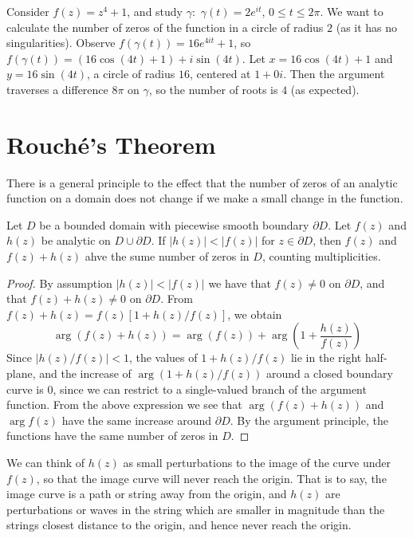 \begin{example}
    Consider $f(z) = z^4 + 1$, and study $\gamma:$ $\gamma(t) = 2e^{it}$, $0 \leq t \leq 2\pi$. We want to calculate the number of zeros of the function in a circle of radius $2$ (as it has no singularities). Observe $f(\gamma(t)) = 16e^{4it}+1$, so $f(\gamma(t)) = (16\cos(4t)+1)+i\sin(4t)$. Let $x = 16\cos(4t)+1$ and $y = 16\sin(4t)$, a circle of radius $16$, centered at $1+0i$. Then the argument traverses a difference $8\pi$ on $\gamma$, so the number of roots is $4$ (as expected).
\end{example}





\section{Rouch\'{e}'s Theorem}

There is a general principle to the effect that the number of zeros of an analytic function on a domain does not change if we make a small change in the function. 

\begin{theorem}
    Let $D$ be a bounded domain with piecewise smooth boundary $\partial D$. Let $f(z)$ and $h(z)$ be analytic on $D\cup \partial D$. If $|h(z)| < |f(z)|$ for $z \in \partial D$, then $f(z)$ and $f(z)+h(z)$ ahve the sume number of zeros in $D$, counting multiplicities.
\end{theorem}
\begin{proof}
    By assumption $|h(z)| < |f(z)|$ we have that $f(z) \neq 0$ on $\partial D$, and that $f(z)+h(z) \neq 0$ on $\partial D$. From $f(z)+h(z) = f(z)[1+h(z)/f(z)]$, we obtain \begin{equation*}
        \arg(f(z)+h(z)) = \arg(f(z))+\arg\left(1+\frac{h(z)}{f(z)}\right)
    \end{equation*}
    Since $|h(z)/f(z)| < 1$, the values of $1+h(z)/f(z)$ lie in the right half-plane, and the increase of $\arg(1+h(z)/f(z))$ around a closed boundary curve is $0$, since we can restrict to a single-valued branch of the argument function. From the above expression we see that $\arg(f(z)+h(z))$ and $\arg f(z)$ have the same increase around $\partial D$. By the argument principle, the functions have the same number of zeros in $D$.
\end{proof}

We can think of $h(z)$ as small perturbations to the image of the curve under $f(z)$, so that the image curve will never reach the origin. That is to say, the image curve is a path or string away from the origin, and $h(z)$ are perturbations or waves in the string which are smaller in magnitude than the strings closest distance to the origin, and hence never reach the origin.


